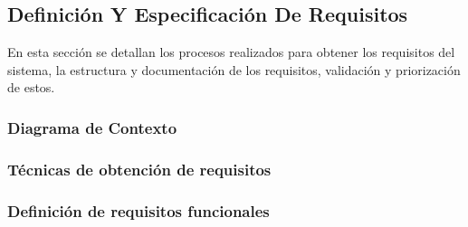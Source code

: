 \documentclass[12pt]{article}
\begin{document}
\subsection{Definición Y Especificación De Requisitos}

En esta sección se detallan los procesos realizados para obtener los requisitos del sistema, la estructura y documentación de los requisitos, validación y priorización de estos.

\subsubsection{Diagrama de Contexto}

\subsubsection{Técnicas de obtención de requisitos}


\subsubsection{Definición de requisitos funcionales}

\end{document}
